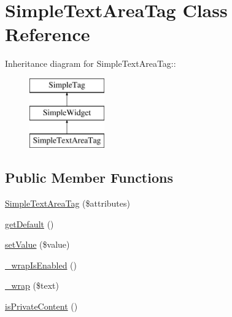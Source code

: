 \hypertarget{class_simple_text_area_tag}{
\section{SimpleTextAreaTag Class Reference}
\label{class_simple_text_area_tag}
}
Inheritance diagram for SimpleTextAreaTag::\begin{figure}[H]
\begin{center}
\leavevmode
\includegraphics[height=3cm]{class_simple_text_area_tag}
\end{center}
\end{figure}
\subsection*{Public Member Functions}
\begin{DoxyCompactItemize}
\item 
\hyperlink{class_simple_text_area_tag_a022780742c3c3265a938c0809a45661c}{SimpleTextAreaTag} (\$attributes)
\item 
\hyperlink{class_simple_text_area_tag_af6b231753b32277ea079a1c55355a27a}{getDefault} ()
\item 
\hyperlink{class_simple_text_area_tag_a5b56885c1a6c81bd955963843586ad34}{setValue} (\$value)
\item 
\hyperlink{class_simple_text_area_tag_a1e2a78176ee9179f70c0a7e7b4a6e103}{\_\-wrapIsEnabled} ()
\item 
\hyperlink{class_simple_text_area_tag_a9bfa978f5170d9a10ec62d83c5460258}{\_\-wrap} (\$text)
\item 
\hyperlink{class_simple_text_area_tag_aef83c24c5a19caeea6447b48f2a3243a}{isPrivateContent} ()
\end{DoxyCompactItemize}


